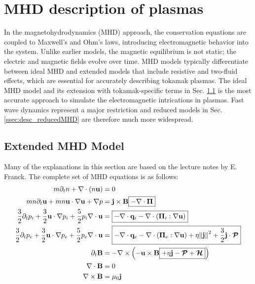 \section{MHD description of plasmas}
\label{sec:desc_MHD}
In the magnetohydrodynamics (MHD) approach, the conservation equations are coupled to Maxwell's and Ohm's laws, introducing electromagnetic behavior into the system. Unlike earlier models, the magnetic equilibrium is not static; the electric and magnetic fields evolve over time. MHD models typically differentiate between ideal MHD and extended models that include resistive and two-fluid effects, which are essential for accurately describing tokamak plasmas. The ideal MHD model and its extension with tokamak-specific terms in Sec. \ref{ssec:desc_extendedMHD} is the most accurate approach to simulate the electromagnetic intrications in plasmas. Fast wave dynamics represent a major restriction and reduced models in Sec. \ref{ssec:desc_reducedMHD} are therefore much more widespread. 

\subsection{Extended MHD Model}
\label{ssec:desc_extendedMHD}
Many of the explanations in this section are based on the lecture notes by E. Franck\cite{lessig2016fluid}. The complete set of MHD equations is as follows:
\begin{align}
	m\partial_t n + \nabla \cdot (n \mathbf{u}) &= 0 \label{eq:desc_MHDmass} \\
	mn\partial_t\mathbf{u} + mn\mathbf{u}\cdot\nabla\mathbf{u} + \nabla p &= \mathbf{j} \times \mathbf{B} \boxed{- \nabla \cdot \boldsymbol{\Pi}} \label{eq:desc_MHDmomentum} \\
	\frac{3}{2}\partial_t p_i + \frac{3}{2} \mathbf{u} \cdot \nabla p_i + \frac{5}{2}p_i \nabla \cdot \mathbf{u} &= \boxed{- \nabla \cdot \mathbf{q}_i - \nabla \cdot (\boldsymbol{\Pi}_i : \nabla \mathbf{u})} \label{eq:desc_MHDionpressure} \\
	\frac{3}{2}\partial_t p_e + \frac{3}{2} \mathbf{u} \cdot \nabla p_e + \frac{5}{2}p_e \nabla \cdot \mathbf{u}  &= \boxed{- \nabla \cdot \mathbf{q}_e - \nabla \cdot (\boldsymbol{\Pi}_e : \nabla \mathbf{u}) + \eta \norm{\mathbf{j}}^2 + \frac{3}{2}\mathbf{j}\cdot \bm{\mathcal{P}}} \label{eq:desc_MHDelectronpressure} \\
	\partial_t \mathbf{B} &= -\nabla \times \left(-\mathbf{u} \times \mathbf{B} \boxed{+ \eta \mathbf{j} - \bm{\mathcal{P}} + \bm{\mathcal{H}}}\right) \label{eq:desc_MHDohmlaw} \\
	\nabla \cdot \mathbf{B} &= 0 \label{eq:desc_MHDgausslaw} \\
	\nabla \times \mathbf{B} &= \mu_0 \mathbf{j} \label{eq:desc_MHDamperelaw}
\end{align}

